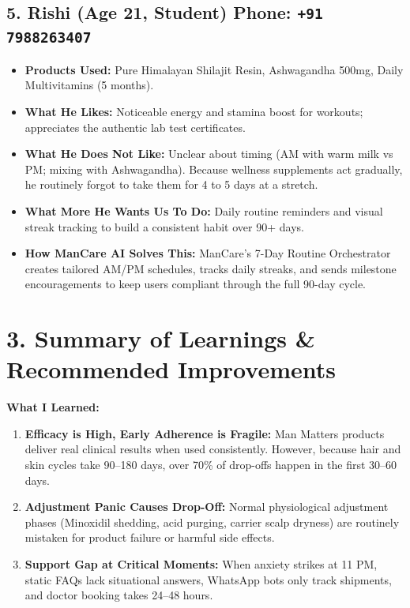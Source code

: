 \documentclass[11pt,a4paper]{article}
\begin{document}
\subsection*{5. Rishi (Age 21, Student) \hfill \normalfont\small Phone: \texttt{+91 7988263407}}
\begin{itemize}
    \item \textbf{Products Used:} Pure Himalayan Shilajit Resin, Ashwagandha 500mg, Daily Multivitamins (5 months).
    \item \textbf{What He Likes:} Noticeable energy and stamina boost for workouts; appreciates the authentic lab test certificates.
    \item \textbf{What He Does Not Like:} Unclear about timing (AM with warm milk vs PM; mixing with Ashwagandha). Because wellness supplements act gradually, he routinely forgot to take them for 4 to 5 days at a stretch.
    \item \textbf{What More He Wants Us To Do:} Daily routine reminders and visual streak tracking to build a consistent habit over 90+ days.
    \item \textbf{\color{brandteal}How ManCare AI Solves This:} ManCare's 7-Day Routine Orchestrator creates tailored AM/PM schedules, tracks daily streaks, and sends milestone encouragements to keep users compliant through the full 90-day cycle.
\end{itemize}

\section*{3. Summary of Learnings \& Recommended Improvements}
\textbf{What I Learned:}
\begin{enumerate}
    \item \textbf{Efficacy is High, Early Adherence is Fragile:} Man Matters products deliver real clinical results when used consistently. However, because hair and skin cycles take 90--180 days, over 70\% of drop-offs happen in the first 30--60 days.
    \item \textbf{Adjustment Panic Causes Drop-Off:} Normal physiological adjustment phases (Minoxidil shedding, acid purging, carrier scalp dryness) are routinely mistaken for product failure or harmful side effects.
    \item \textbf{Support Gap at Critical Moments:} When anxiety strikes at 11 PM, static FAQs lack situational answers, WhatsApp bots only track shipments, and doctor booking takes 24--48 hours.
\end{enumerate}
\end{document}
